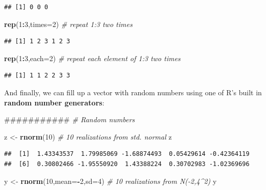 \documentclass[]{article}
\newenvironment{Shaded}{\begin{snugshade}}{\end{snugshade}}
\newcommand{\KeywordTok}[1]{\textcolor[rgb]{0.13,0.29,0.53}{\textbf{#1}}}
\newcommand{\DataTypeTok}[1]{\textcolor[rgb]{0.13,0.29,0.53}{#1}}
\newcommand{\DecValTok}[1]{\textcolor[rgb]{0.00,0.00,0.81}{#1}}
\newcommand{\StringTok}[1]{\textcolor[rgb]{0.31,0.60,0.02}{#1}}
\newcommand{\CommentTok}[1]{\textcolor[rgb]{0.56,0.35,0.01}{\textit{#1}}}
\newcommand{\OperatorTok}[1]{\textcolor[rgb]{0.81,0.36,0.00}{\textbf{#1}}}
\newcommand{\NormalTok}[1]{#1}
\begin{document}
\begin{verbatim}
## [1] 0 0 0
\end{verbatim}

\begin{Shaded}
\begin{Highlighting}[]
\KeywordTok{rep}\NormalTok{(}\DecValTok{1}\OperatorTok{:}\DecValTok{3}\NormalTok{,}\DataTypeTok{times=}\DecValTok{2}\NormalTok{)              }\CommentTok{# repeat 1:3 two times}
\end{Highlighting}
\end{Shaded}

\begin{verbatim}
## [1] 1 2 3 1 2 3
\end{verbatim}

\begin{Shaded}
\begin{Highlighting}[]
\KeywordTok{rep}\NormalTok{(}\DecValTok{1}\OperatorTok{:}\DecValTok{3}\NormalTok{,}\DataTypeTok{each=}\DecValTok{2}\NormalTok{)               }\CommentTok{# repeat each element of 1:3 two times}
\end{Highlighting}
\end{Shaded}

\begin{verbatim}
## [1] 1 1 2 2 3 3
\end{verbatim}

And finally, we can fill up a vector with random numbers using one of
R's built in \textbf{random number generators}:

\begin{Shaded}
\begin{Highlighting}[]
\NormalTok{###########}
\CommentTok{# Random numbers}

\NormalTok{z <-}\StringTok{ }\KeywordTok{rnorm}\NormalTok{(}\DecValTok{10}\NormalTok{)                }\CommentTok{# 10 realizations from std. normal}
\NormalTok{z}
\end{Highlighting}
\end{Shaded}

\begin{verbatim}
##  [1]  1.43343537  1.79985069 -1.68874493  0.05429614 -0.42364119
##  [6]  0.30802466 -1.95550920  1.43388224  0.30702983 -1.02369696
\end{verbatim}

\begin{Shaded}
\begin{Highlighting}[]
\NormalTok{y <-}\StringTok{ }\KeywordTok{rnorm}\NormalTok{(}\DecValTok{10}\NormalTok{,}\DataTypeTok{mean=}\OperatorTok{-}\DecValTok{2}\NormalTok{,}\DataTypeTok{sd=}\DecValTok{4}\NormalTok{)           }\CommentTok{# 10 realizations from N(-2,4^2)}
\NormalTok{y}
\end{Highlighting}
\end{Shaded}
\end{document}
